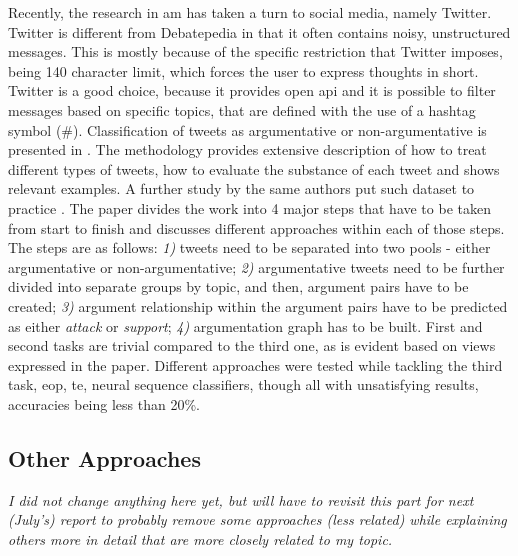         Recently, the research in \gls{am} has taken a turn to social media, namely Twitter. Twitter is different from Debatepedia in that it often contains noisy, unstructured messages. This is mostly because of the specific restriction that Twitter imposes, being 140 character limit, which forces the user to express thoughts in short. Twitter is a good choice, because it provides open \gls{api} and it is possible to filter messages based on specific topics, that are defined with the use of a hashtag symbol (\#). Classification of tweets as argumentative or non-argumentative is presented in \autocite{Bosc2016DARTAD}. The methodology provides extensive description of how to treat different types of tweets, how to evaluate the substance of each tweet and shows relevant examples. A further study by the same authors put such dataset to practice \autocite{Bosc2016TweetiesSP}. The paper divides the work into 4 major steps that have to be taken from start to finish and discusses different approaches within each of those steps. The steps are as follows: \textit{1)} tweets need to be separated into two pools - either argumentative or non-argumentative; \textit{2)} argumentative tweets need to be further divided into separate groups by topic, and then, argument pairs have to be created; \textit{3)} argument relationship within the argument pairs have to be predicted as either \textit{attack} or \textit{support}; \textit{4)} argumentation graph has to be built. First and second tasks are trivial compared to the third one, as is evident based on views expressed in the paper. Different approaches were tested while tackling the third task, \gls{eop}, \gls{te}, neural sequence classifiers, though all with unsatisfying results, accuracies being less than 20\%.
    
     
    \subsection{Other Approaches}
        \textit{I did not change anything here yet, but will have to revisit this part for next (July's) report to probably remove some approaches (less related) while explaining others more in detail that are more closely related to my topic.}
        
